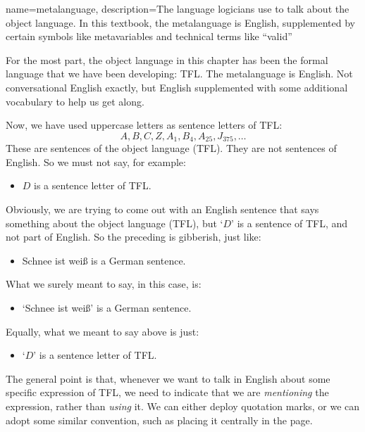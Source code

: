 {
name=metalanguage,
description={The language logicians use to talk about the object language. In this textbook, the metalanguage is English, supplemented by certain symbols like metavariables and technical terms like ``valid''}
}

For the most part, the object language in this chapter has been the formal language that we have been developing: TFL. The metalanguage is English. Not conversational English exactly, but English supplemented with some additional vocabulary to help us get along.

Now, we have used uppercase letters as sentence letters of TFL:
	$$A, B, C, Z, A_1, B_4, A_{25}, J_{375},\ldots$$
These are sentences of the object language (TFL). They are not sentences of English. So we must not say, for example:
	\begin{itemize}
		\item $D$ is a sentence letter of TFL.
	\end{itemize}
Obviously, we are trying to come out with an English sentence that says something about the object language (TFL), but `$D$' is a sentence of TFL, and not part of English. So the preceding is gibberish, just like:
	\begin{itemize}
		\item \foreignlanguage{german}{Schnee ist wei\ss} is a German sentence.
	\end{itemize}
What we surely meant to say, in this case, is:
	\begin{itemize}
		\item `\foreignlanguage{german}{Schnee ist wei\ss}' is a German sentence.
	\end{itemize}
Equally, what we meant to say above is just:
	\begin{itemize}
		\item `$D$' is a sentence letter of TFL.
	\end{itemize}
The general point is that, whenever we want to talk in English about some specific expression of TFL, we need to indicate that we are \emph{mentioning} the expression, rather than \emph{using} it. We can either deploy quotation marks, or we can adopt some similar convention, such as  placing it centrally in the page.



